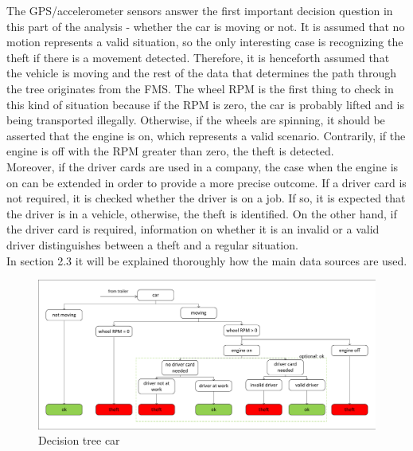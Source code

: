 The GPS/accelerometer sensors answer the first important decision question in this part of the analysis - whether the car is moving or not. It is assumed that no motion represents a valid situation, so the only interesting case is recognizing the theft if there is a movement detected. Therefore, it is henceforth assumed that the vehicle is moving and the rest of the data that determines the path through the tree originates from the FMS. The wheel RPM is the first thing to check in this kind of situation because if the RPM is zero, the car is probably lifted and is being transported illegally. Otherwise, if the wheels are spinning, it should be asserted that the engine is on, which represents a valid scenario. Contrarily, if the engine is off with the RPM greater than zero, the theft is detected.\\
Moreover, if the driver cards are used in a company, the case when the engine is on can be extended in order to provide a more precise outcome. If a driver card is not required, it is checked whether the driver is on a job. If so, it is expected that the driver is in a vehicle, otherwise, the theft is identified. On the other hand, if the driver card is required, information on whether it is an invalid or a valid driver distinguishes between a theft and a regular situation. \\
In section 2.3 it will be explained thoroughly how the main data sources are used.

\begin{figure} [h]
    \includegraphics[clip, trim=0.1cm 0.1cm 0.1cm 0.1cm, width=1\textwidth]{src/pic/DecisionTreeCar}
    \caption{Decision tree car}
    \label{fig::decisionTreeCar}
\end{figure}


\clearpage